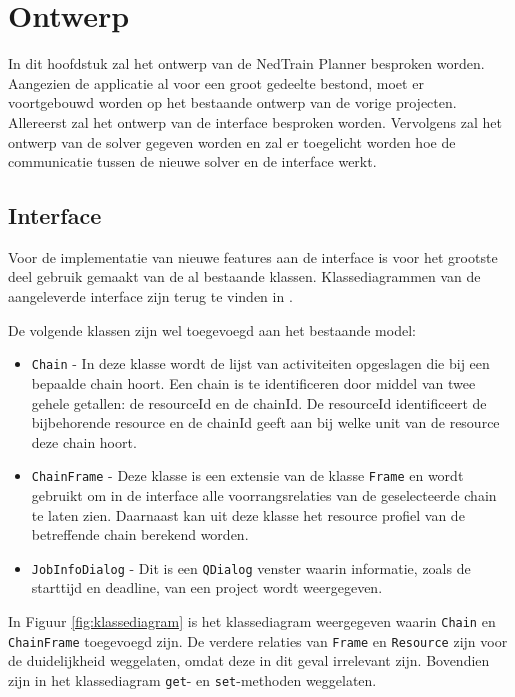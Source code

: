 \section{Ontwerp}
In dit hoofdstuk zal het ontwerp van de NedTrain Planner besproken worden. Aangezien de applicatie al voor een groot gedeelte bestond, moet er voortgebouwd worden op het bestaande ontwerp van de vorige projecten. Allereerst zal het ontwerp van de interface besproken worden. Vervolgens zal het ontwerp van de solver gegeven worden en zal er toegelicht worden hoe de communicatie tussen de nieuwe solver en de interface werkt.

\subsection{Interface}
Voor de implementatie van nieuwe features aan de interface is voor het grootste deel gebruik gemaakt van de al bestaande klassen. Klassediagrammen van de aangeleverde interface zijn terug te vinden in \cite{bep2012nedtrain}.

De volgende klassen zijn wel toegevoegd aan het bestaande model:
\begin{itemize}
\item \texttt{Chain} - In deze klasse wordt de lijst van activiteiten opgeslagen die bij een bepaalde chain hoort. Een chain is te identificeren door middel van twee gehele getallen: de resourceId en de chainId. De resourceId identificeert de bijbehorende resource en de chainId geeft aan bij welke unit van de resource deze chain hoort.
\item \texttt{ChainFrame} - Deze klasse is een extensie van de klasse \texttt{Frame} en wordt gebruikt om in de interface alle voorrangsrelaties van de geselecteerde chain te laten zien. Daarnaast kan uit deze klasse het resource profiel van de betreffende chain berekend worden.
\item \texttt{JobInfoDialog} - Dit is een \texttt{QDialog} venster waarin informatie, zoals de starttijd en deadline, van een project wordt weergegeven.
\end{itemize}

In Figuur \ref{fig:klassediagram} is het klassediagram weergegeven waarin \texttt{Chain} en \texttt{ChainFrame} toegevoegd zijn. De verdere relaties van \texttt{Frame} en \texttt{Resource} zijn voor de duidelijkheid weggelaten, omdat deze in dit geval irrelevant zijn. Bovendien zijn in het klassediagram \texttt{get}- en \texttt{set}-methoden weggelaten.

